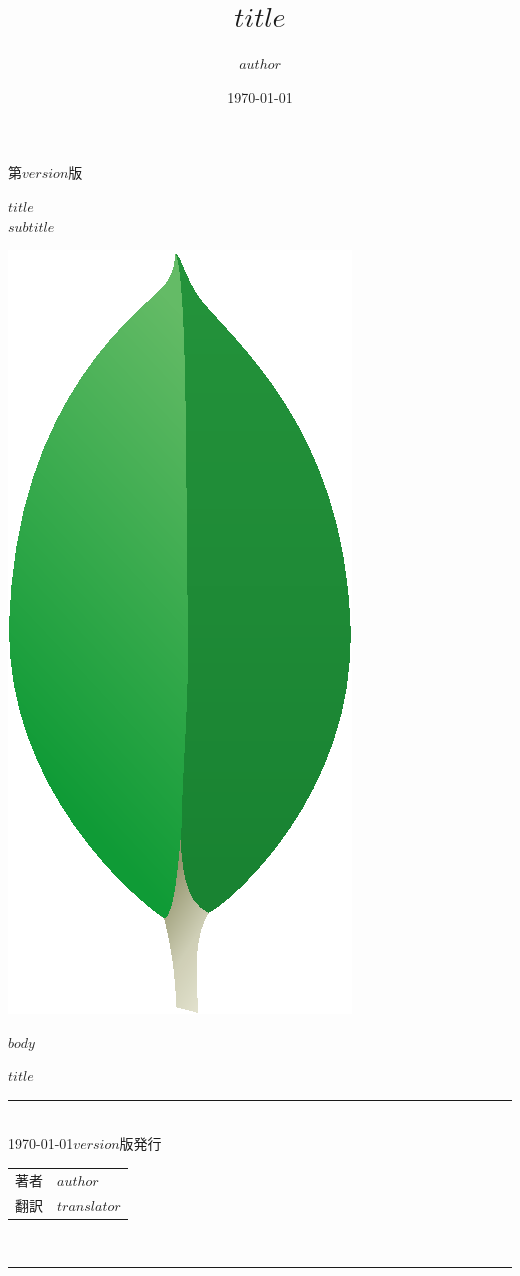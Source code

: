 \documentclass[a4j,oneside,11ptj,uplatex]{jsbook}
\title{$title$}
\author{$author$}
\date{\today}
\begin{document}
\begin{titlepage}
\begin{flushright}
{\sf 第$version$版}
\end{flushright}
\vspace*{3em}
\begin{center}
{\HUGE\gt\sf\textbf{$title$}}
\bigskip\\
{\LARGE\it{$subtitle$}}
\bigskip\\
{\LARGE\gt{}}

\vspace{8em}
\includegraphics{title.eps}
\end{center}

\end{titlepage}

\clearpage

$body$

\clearpage
\thispagestyle{empty}
\vspace*{\fill}

{\noindent\Large{$title$}} \\
\rule[8pt]{14cm}{1pt} \\
{\noindent
\today $version$版発行
\noindent
}
\bigskip\\
\begin{tabular}{ll}
著者 & $author$ \\
翻訳 & $translator$ \\
\end{tabular}
\bigskip\\
\rule[0pt]{14cm}{1pt} \\
\end{document}

